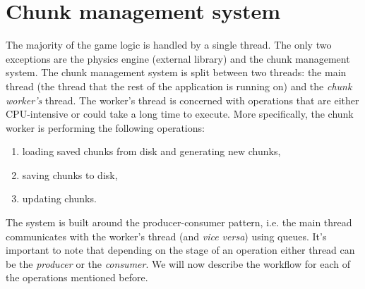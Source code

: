 \section{Chunk management system} \label{sec:chunk-worker}
The majority of the game logic is handled by a single thread.
The only two exceptions are the physics engine (external library) and the chunk management system.
The chunk management system is split between two threads: the main thread (the thread that the rest of the application is running on) and the \textit{chunk worker's} thread.
The worker's thread is concerned with operations that are either CPU-intensive or could take a long time to execute.
More specifically, the chunk worker is performing the following operations:
\begin{enumerate}
    \item loading saved chunks from disk and generating new chunks,
    \item saving chunks to disk,
    \item updating chunks.
\end{enumerate}
The system is built around the producer-consumer pattern, i.e. the main thread communicates with the worker's thread (and \textit{vice versa}) using queues.
It's important to note that depending on the stage of an operation either thread can be the \textit{producer} or the \textit{consumer}.
We will now describe the workflow for each of the operations mentioned before.



